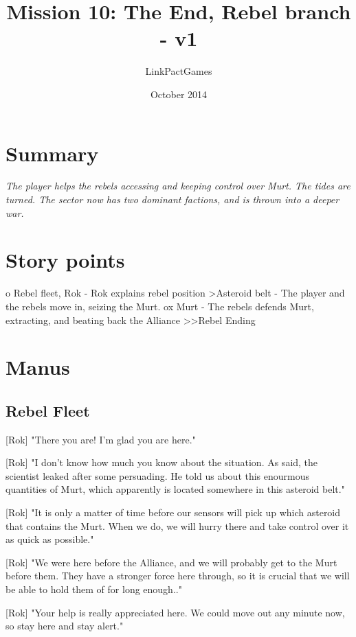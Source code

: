 \documentclass[a4paper,12pt]{article}
\begin{document}
\title{Mission 10: The End, Rebel branch - v1}
\author{LinkPactGames}
\date{October 2014}
\maketitle

\section{Summary}

\textit{The player helps the rebels accessing and keeping control over Murt. The tides are turned.
The sector now has two dominant factions, and is thrown into a deeper war.}

\section{Story points}

o Rebel fleet, Rok - Rok explains rebel position
\textgreater Asteroid belt - The player and the rebels move in, seizing the Murt.
ox Murt - The rebels defends Murt, extracting, and beating back the Alliance
\textgreater \textgreater Rebel Ending

\section{Manus}

\subsection{Rebel Fleet}

[Rok] "There you are! I'm glad you are here."

[Rok] "I don't know how much you know about the situation. As said, the scientist leaked after some persuading.
He told us about this enourmous quantities of Murt, which apparently is located somewhere in this asteroid belt."

[Rok] "It is only a matter of time before our sensors will pick up which asteroid that contains the Murt. When we do,
we will hurry there and take control over it as quick as possible."

[Rok] "We were here before the Alliance, and we will probably get to the Murt before them. They have a stronger force
here through, so it is crucial that we will be able to hold them of for long enough.."

[Rok] "Your help is really appreciated here. We could move out any minute now, so stay here and stay alert."
\end{document}
